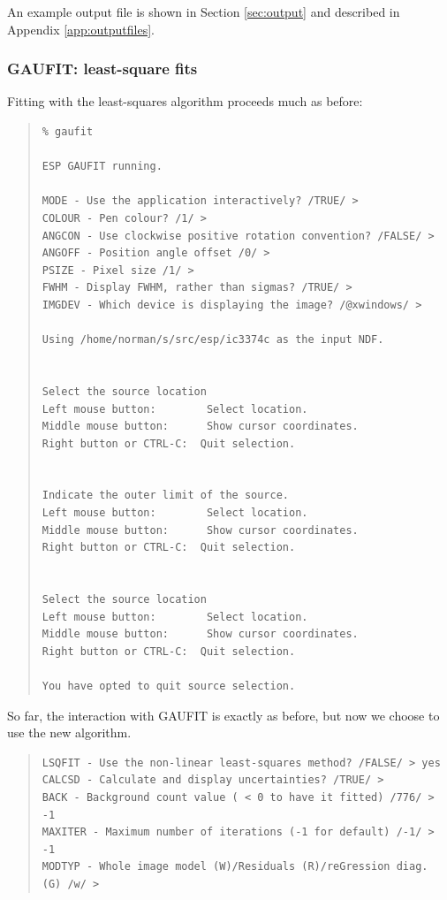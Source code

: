 \documentclass[twoside,11pt]{article}
\newenvironment{myquote}{\begin{quote}\begin{small}}{\end{small}\end{quote}}
\begin{document}
An example output file is shown in Section \ref{sec:output}
and described in Appendix \ref{app:outputfiles}.

\subsubsection{GAUFIT: least-square fits}

Fitting with the least-squares algorithm proceeds much as before:

\begin{myquote}
\begin{verbatim}
% gaufit

ESP GAUFIT running.

MODE - Use the application interactively? /TRUE/ > 
COLOUR - Pen colour? /1/ > 
ANGCON - Use clockwise positive rotation convention? /FALSE/ > 
ANGOFF - Position angle offset /0/ > 
PSIZE - Pixel size /1/ > 
FWHM - Display FWHM, rather than sigmas? /TRUE/ > 
IMGDEV - Which device is displaying the image? /@xwindows/ > 

Using /home/norman/s/src/esp/ic3374c as the input NDF.


Select the source location
Left mouse button:        Select location.
Middle mouse button:      Show cursor coordinates.
Right button or CTRL-C:  Quit selection.


Indicate the outer limit of the source.
Left mouse button:        Select location.
Middle mouse button:      Show cursor coordinates.
Right button or CTRL-C:  Quit selection.


Select the source location
Left mouse button:        Select location.
Middle mouse button:      Show cursor coordinates.
Right button or CTRL-C:  Quit selection.

You have opted to quit source selection.
\end{verbatim}
\end{myquote}

So far, the interaction with GAUFIT is exactly as before, but now we
choose to use the new algorithm.

\begin{myquote}
\begin{verbatim}
LSQFIT - Use the non-linear least-squares method? /FALSE/ > yes
CALCSD - Calculate and display uncertainties? /TRUE/ > 
BACK - Background count value ( < 0 to have it fitted) /776/ > -1
MAXITER - Maximum number of iterations (-1 for default) /-1/ > -1
MODTYP - Whole image model (W)/Residuals (R)/reGression diag. (G) /w/ >
\end{verbatim}
\end{myquote}
\end{document}
